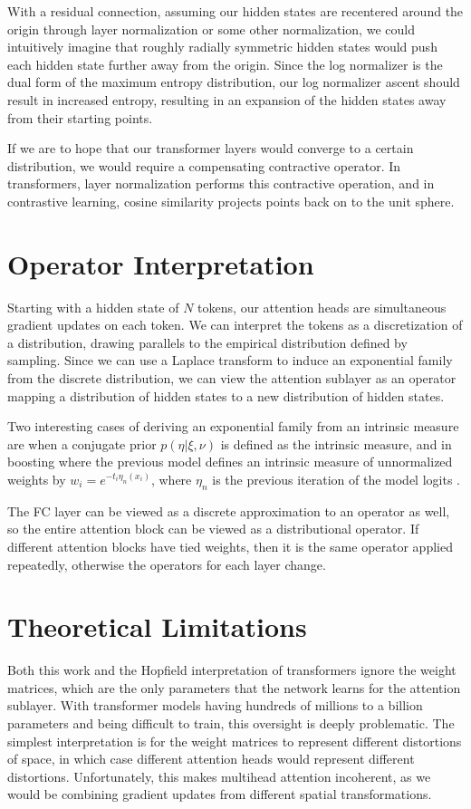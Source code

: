 \documentclass{article}
\begin{document}
With a residual connection, assuming our hidden states are recentered around the origin through layer normalization or some other normalization, we could intuitively imagine that roughly radially symmetric hidden states would push each hidden state further away from the origin.
Since the log normalizer is the dual form of the maximum entropy distribution, our log normalizer ascent should result in increased entropy, resulting in an expansion of the hidden states away from their starting points.

If we are to hope that our transformer layers would converge to a certain distribution, we would require a compensating contractive operator. In transformers, layer normalization performs this contractive operation, and in contrastive learning, cosine similarity projects points back on to the unit sphere.

\section{Operator Interpretation}
\label{operator interpretation}

Starting with a hidden state of $N$ tokens, our attention heads are simultaneous gradient updates on each token. 
We can interpret the tokens as a discretization of a distribution, drawing parallels to the empirical distribution defined by sampling. 
Since we can use a Laplace transform to induce an exponential family from the discrete distribution, we can view the attention sublayer as an operator mapping a distribution of hidden states to a new distribution of hidden states.

Two interesting cases of deriving an exponential family from an intrinsic measure are when a conjugate prior $ p( \eta \vert \xi, \nu )$ is defined as the intrinsic measure, and in boosting where the previous model defines an intrinsic measure of unnormalized weights by $w_i = e^{ - t_i \eta_n(x_i) } $, where $\eta_n$ is the previous iteration of the model logits \cite{collins00logistic}.

The FC layer can be viewed as a discrete approximation to an operator as well, so the entire attention block can be viewed as a distributional operator.  If different attention blocks have tied weights, then it is the same operator applied repeatedly, otherwise the operators for each layer change.

\section{Theoretical Limitations}
\label{limitations}
Both this work and the Hopfield interpretation of transformers ignore the weight matrices, which are the only parameters that the network learns for the attention sublayer. 
With transformer models having hundreds of millions to a billion parameters and being difficult to train, this oversight is deeply problematic. 
The simplest interpretation is for the weight matrices to represent different distortions of space, in which case different attention heads would represent different distortions.
Unfortunately, this makes multihead attention incoherent, as we would be combining gradient updates from different spatial transformations.
\end{document}

